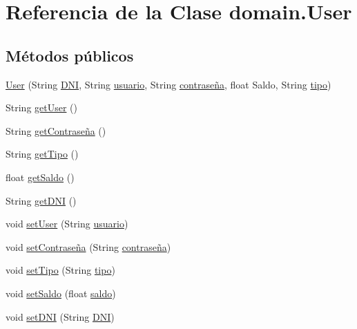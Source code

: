 \hypertarget{classdomain_1_1User}{}\section{Referencia de la Clase domain.\+User}
\label{classdomain_1_1User}
\subsection*{Métodos públicos}
\begin{DoxyCompactItemize}
\item 
\mbox{\hyperlink{classdomain_1_1User_abffd907e53fb2c2c2d97c8c7688fd4a4}{User}} (String \mbox{\hyperlink{classdomain_1_1User_a9f89fcc3016d3a74f4660f1e3c133882}{D\+NI}}, String \mbox{\hyperlink{classdomain_1_1User_a3039c018dafefc6ce963346e58f80fe6}{usuario}}, String \mbox{\hyperlink{classdomain_1_1User_aaa44e4ca80b63275a62812ab55808fb0}{contraseña}}, float Saldo, String \mbox{\hyperlink{classdomain_1_1User_a3e3d2bcaf19448f31142d301db0493be}{tipo}})
\item 
String \mbox{\hyperlink{classdomain_1_1User_a1d9197078569283ae7410f9af2d8d013}{get\+User}} ()
\item 
String \mbox{\hyperlink{classdomain_1_1User_a99940b286983066419b4cb940936fdac}{get\+Contraseña}} ()
\item 
String \mbox{\hyperlink{classdomain_1_1User_a38873ecd67b4dccdf3bb067df7d9eb06}{get\+Tipo}} ()
\item 
float \mbox{\hyperlink{classdomain_1_1User_ab3b58a7e3f345ddf8df5b87ad772b7d5}{get\+Saldo}} ()
\item 
String \mbox{\hyperlink{classdomain_1_1User_a9a0a7affd1ab9ba7d882317d5da47888}{get\+D\+NI}} ()
\item 
void \mbox{\hyperlink{classdomain_1_1User_ae58cb8a12b63ea9f60b8308ab3e09712}{set\+User}} (String \mbox{\hyperlink{classdomain_1_1User_a3039c018dafefc6ce963346e58f80fe6}{usuario}})
\item 
void \mbox{\hyperlink{classdomain_1_1User_ae292b37cef599e77881672b0b848f136}{set\+Contraseña}} (String \mbox{\hyperlink{classdomain_1_1User_aaa44e4ca80b63275a62812ab55808fb0}{contraseña}})
\item 
void \mbox{\hyperlink{classdomain_1_1User_aa5010bb10a4aaacd7731ca313e2ae6ce}{set\+Tipo}} (String \mbox{\hyperlink{classdomain_1_1User_a3e3d2bcaf19448f31142d301db0493be}{tipo}})
\item 
void \mbox{\hyperlink{classdomain_1_1User_ab0da73a44b69fbb13668ec2093e8d3e7}{set\+Saldo}} (float \mbox{\hyperlink{classdomain_1_1User_abfe10a19b15929745bc34610db010938}{saldo}})
\item 
void \mbox{\hyperlink{classdomain_1_1User_acdb5b5bf6b571a77af5596da0da953fa}{set\+D\+NI}} (String \mbox{\hyperlink{classdomain_1_1User_a9f89fcc3016d3a74f4660f1e3c133882}{D\+NI}})
\end{DoxyCompactItemize}

